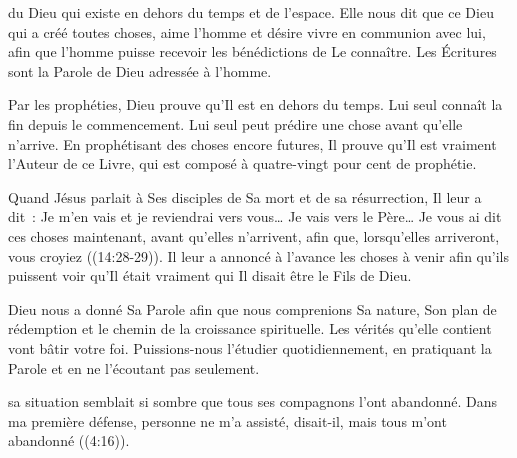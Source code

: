  du Dieu qui existe en dehors du temps et de l'espace.
 Elle nous dit que ce Dieu qui a créé toutes choses,
 aime l'homme et désire vivre en communion avec lui,
 afin que l'homme puisse recevoir les bénédictions de Le connaître.
 Les Écritures sont la Parole de Dieu adressée à l'homme.


Par les prophéties, Dieu prouve qu'Il est en dehors du temps.
 Lui seul connaît la fin depuis le commencement.
 Lui seul peut prédire une chose avant qu'elle n'arrive.
 En prophétisant des choses encore futures, Il prouve qu'Il est vraiment
 l'Auteur de ce Livre, qui est composé à quatre-vingt pour cent de prophétie. 

Quand Jésus parlait à Ses disciples de Sa mort et de sa résurrection,
 Il leur a dit~: 
 \og Je m'en vais et je reviendrai vers vous\dots{}
 Je vais vers le Père\dots{} Je vous ai dit ces choses maintenant,
 avant qu'elles n'arrivent, afin que, lorsqu'elles arriveront,
 vous croyiez \fg{} ((14:28-29)).
 Il leur a annoncé à l'avance les choses à venir afin qu'ils puissent
 voir qu'Il était vraiment qui Il disait être \ocadr le Fils de Dieu. 

Dieu nous a donné Sa Parole afin que nous comprenions Sa nature,
 Son plan de rédemption et le chemin de la croissance spirituelle.
 Les vérités qu'elle contient vont bâtir votre foi.
 Puissions-nous l'étudier quotidiennement, en pratiquant la Parole
 et en ne l'écoutant pas seulement.

\dvrule






 sa situation semblait si sombre que tous ses compagnons l'ont abandonné.
 \og Dans ma première défense, personne ne m'a assisté,
 disait-il, mais tous m'ont abandonné \fg{}
 ((4:16)).

